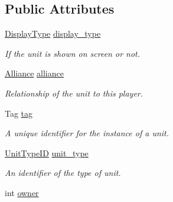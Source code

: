 \subsection*{Public Attributes}
\begin{DoxyCompactItemize}
\item 
\mbox{\label{classsc2_1_1_unit_a37330a1811b5fe37894d13d8b8f000ac}} 
\hyperlink{classsc2_1_1_unit_af7815dad89107a05298c245b702ab270}{Display\+Type} \hyperlink{classsc2_1_1_unit_a37330a1811b5fe37894d13d8b8f000ac}{display\+\_\+type}
\begin{DoxyCompactList}\small\item\em If the unit is shown on screen or not. \end{DoxyCompactList}\item 
\mbox{\label{classsc2_1_1_unit_a639d0b3495e03ee28f5e91b16057d42b}} 
\hyperlink{classsc2_1_1_unit_a5a40e672e7599d73ef8ef5758bbd7461}{Alliance} \hyperlink{classsc2_1_1_unit_a639d0b3495e03ee28f5e91b16057d42b}{alliance}
\begin{DoxyCompactList}\small\item\em Relationship of the unit to this player. \end{DoxyCompactList}\item 
\mbox{\label{classsc2_1_1_unit_a1312ee20e783753ee8ddf054878f7d9f}} 
Tag \hyperlink{classsc2_1_1_unit_a1312ee20e783753ee8ddf054878f7d9f}{tag}
\begin{DoxyCompactList}\small\item\em A unique identifier for the instance of a unit. \end{DoxyCompactList}\item 
\mbox{\label{classsc2_1_1_unit_a4d7e26d2a7a33bc685fc3696dfed026f}} 
\hyperlink{classsc2_1_1_s_c2_type}{Unit\+Type\+ID} \hyperlink{classsc2_1_1_unit_a4d7e26d2a7a33bc685fc3696dfed026f}{unit\+\_\+type}
\begin{DoxyCompactList}\small\item\em An identifier of the type of unit. \end{DoxyCompactList}\item 
\mbox{\label{classsc2_1_1_unit_a29fec2e9dff50d8504e8a2b32f7a1af0}} 
int \hyperlink{classsc2_1_1_unit_a29fec2e9dff50d8504e8a2b32f7a1af0}{owner}

\end{DoxyCompactItemize}
